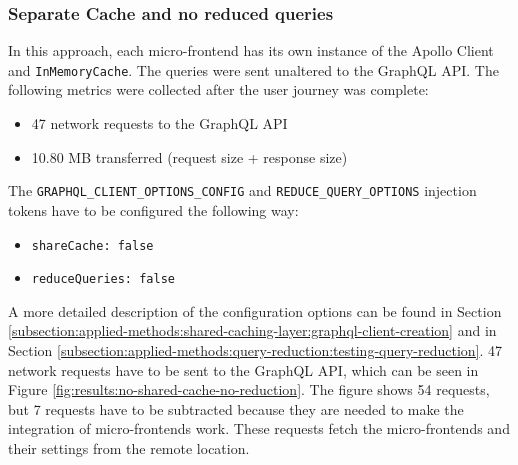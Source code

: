 \subsubsection{Separate Cache and no reduced queries}\label{subsubsection:results:performance-measurement:separate-cache-no-reduction}

In this approach, each micro-frontend has its own instance of the Apollo Client and \texttt{InMemoryCache}. The queries were sent unaltered to the GraphQL \ac{API}. The following metrics were collected after the user journey was complete:

\begin{itemize}
  \item 47 network requests to the GraphQL \ac{API}
  \item 10.80 MB transferred (request size + response size)
\end{itemize}

\noindent The \texttt{GRAPHQL\_CLIENT\_OPTIONS\_CONFIG} and \texttt{REDUCE\_QUERY\_OPTIONS} injection tokens have to be configured the following way:

\begin{itemize}
  \item \texttt{shareCache: false}
  \item \texttt{reduceQueries: false}
\end{itemize}

\noindent A more detailed description of the configuration options can be found in Section \ref{subsection:applied-methods:shared-caching-layer:graphql-client-creation} and in Section \ref{subsection:applied-methods:query-reduction:testing-query-reduction}. 47 network requests have to be sent to the GraphQL \ac{API}, which can be seen in Figure \ref{fig:results:no-shared-cache-no-reduction}. The figure shows 54 requests, but 7 requests have to be subtracted because they are needed to make the integration of micro-frontends work. These requests fetch the micro-frontends and their settings from the remote location.

